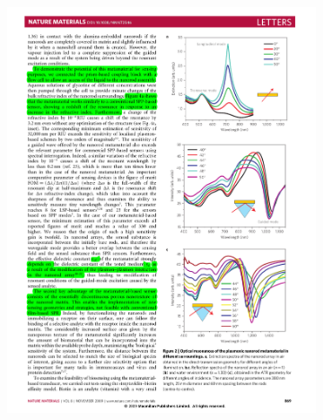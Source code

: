 \documentclass[letterpaper,11pt] {article}
\begin{document}
	\begin{figure}[h!]\centering
		\begin{subfigure}{.01\linewidth}\caption{ }\label{sfig:DipATR} \vspace{3.5cm}	\end{subfigure}  
		\begin{subfigure}{.29\linewidth}\includegraphics[scale=.68]{0-ATRKobashin2009}\end{subfigure}	\hspace{1em}
		\begin{subfigure}{.01\linewidth}\caption{ }\label{sfig:k(w)Kobashin} \vspace{3.5cm}	\end{subfigure} 

\end{figure}
\end{document}
